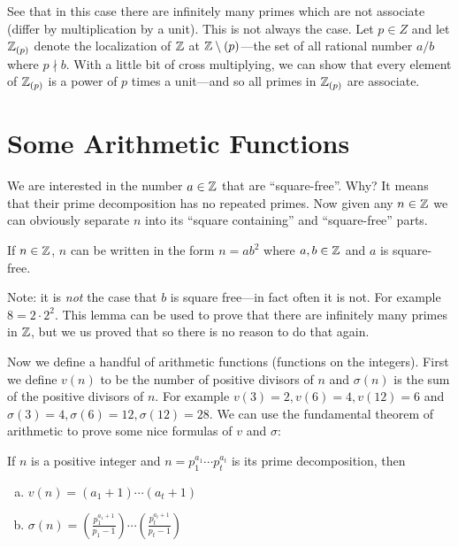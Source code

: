 See that in this case there are infinitely many primes which are not associate
(differ by multiplication by a unit). This is not always the case. Let
\(p \in Z\) and let \(\mathbb{Z}_{(p)}\) denote the localization of \(\mathbb{Z} \) at
\(\mathbb{Z} \setminus (p) \)---the set of all rational number \(a / b \) where
\(p \nmid b\). With a little bit of cross multiplying, we can show that every
element of \(\mathbb{Z} _{(p)}\) is a power of \(p\) times a unit---and so all primes
in \(\mathbb{Z} _{(p)}\) are associate.

\section{Some Arithmetic Functions}%
\label{sec:arithfuns}

We are interested in the number \(a \in \mathbb{Z} \) that are ``square-free''. Why? It
means that their prime decomposition has no repeated primes. Now given any
\(n \in \mathbb{Z} \) we can obviously separate \(n\) into its ``square containing''
and ``square-free'' parts.

\begin{prop}
  If \(n \in \mathbb{Z} \), \(n\) can be written in the form \(n=ab^2\) where
  \(a,b \in \mathbb{Z} \) and \(a\) is square-free.
\end{prop}

Note: it is \emph{not} the case that \(b\) is square free---in fact often it is
not. For example \(8=2 \cdot 2^2\). This lemma can be used to prove that there
are infinitely many primes in \(\mathbb{Z} \), but we us proved that so there is no
reason to do that again.

Now we define a handful of arithmetic functions (functions on the integers).
First we define \(v(n)\) to be the number of positive divisors of \(n\) and
\(\sigma(n)\) is the sum of the positive divisors of \(n\). For example
\(v(3)=2,v(6)=4,v(12)=6\) and \(\sigma(3)=4,\sigma(6)=12,\sigma(12)=28\). We can
use the fundamental theorem of arithmetic to prove some nice formulas of \(v\)
and \(\sigma\):

\begin{prop}
  If \(n\) is a positive integer and \(n=p_1^{a_{1}}\cdots p_t^{a_t}\) is its
  prime decomposition, then
  \begin{enumerate}[(a)]
    \item \(v(n) = (a_1+1)\cdots(a_t+1)\)
    \item \(\sigma(n) = \left( \frac{p_1^{a_1+1}}{p_1-1} \right)\cdots \left( \frac{p_t^{a_t+1}}{p_t-1} \right) \)
  \end{enumerate}
\end{prop}

